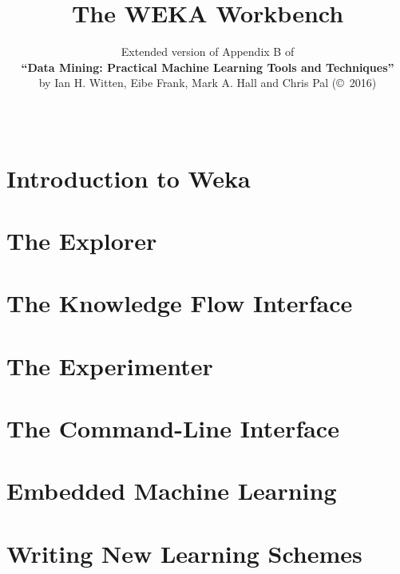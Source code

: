 \documentclass[a4paper]{book}
\title{{\Huge \hspace{2cm}The WEKA Workbench}}
\author{Extended version of Appendix B of\\{\bf ``Data Mining: Practical Machine Learning Tools and Techniques''}\\by Ian H. Witten, Eibe Frank, Mark A. Hall and Chris Pal (\copyright\ 2016)}
\date{ ~\vspace{1cm} \\\hspace{2cm}\epsfig{file=images/Book4thEd.jpg,width=6cm}}
\begin{document}
\begin{titlepage}
\maketitle

\end{titlepage}

\tableofcontents

\chapter{Introduction to Weka}


\chapter{The Explorer}
\label{chapt:explorer}


\chapter{The Knowledge Flow Interface}
\label{chapt:knowledge_flow}


\chapter{The Experimenter}
\label{chapt:experimenter}


\chapter{The Command-Line Interface}
\label{chapt:command_line}


\chapter{Embedded Machine Learning}
\label{chapt:embedded}


\chapter{Writing New Learning Schemes}
\label{chapt:writing_learning_schemes}

\end{document}
